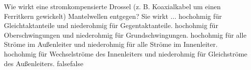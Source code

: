     {Wie wirkt eine stromkompensierte Drossel (z. B. Koaxialkabel um einen Ferritkern gewickelt) Mantelwellen entgegen? Sie wirkt ...}
    {hochohmig für Gleichtaktanteile und niederohmig für Gegentaktanteile.}
    {hochohmig für Oberschwingungen und niederohmig für Grundschwingungen.}
    {hochohmig für alle Ströme im Außenleiter und niederohmig für alle Ströme im Innenleiter.}
    {hochohmig für Wechselströme des Innenleiters und niederohmig für Gleichströme des Außenleiters.}
    {false}{false}